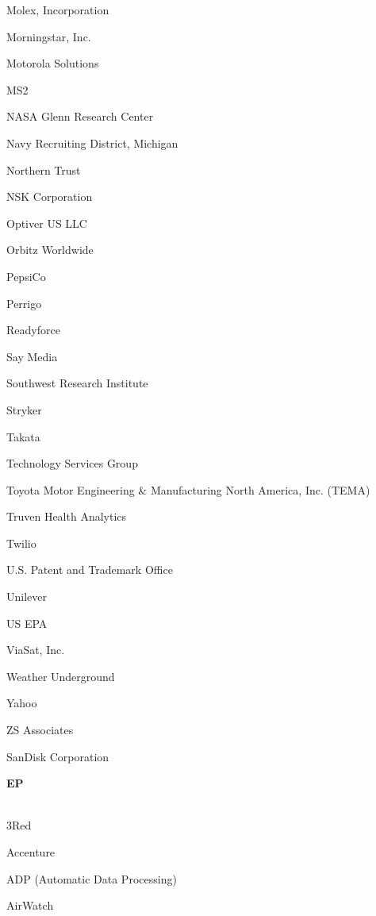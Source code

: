 \documentclass[twoside]{article}
\begin{document}
\begin{center}
\begin{multicols}{5}
\begin{FlushLeft}
\begin{compactitem}
\item Molex, Incorporation
\item Morningstar, Inc.
\item Motorola Solutions
\item MS2
\item NASA Glenn Research Center
\item Navy Recruiting District, Michigan
\item Northern Trust
\item NSK Corporation
\item Optiver US LLC
\item Orbitz Worldwide
\item PepsiCo
\item Perrigo
\item Readyforce
\item Say Media
\item Southwest Research Institute
\item Stryker
\item Takata
\item Technology Services Group
\item Toyota Motor Engineering \& Manufacturing North America, Inc. (TEMA)
\item Truven Health Analytics
\item Twilio
\item U.S. Patent and Trademark Office
\item Unilever
\item US EPA
\item ViaSat, Inc.
\item Weather Underground
\item Yahoo
\item ZS Associates
\item SanDisk Corporation
\end{compactitem}
        \end{FlushLeft}
        \vspace{1em}
        {\fontsize{14}{16}\selectfont \bf EP}\\
        \vspace{-1em}
        ~\hrulefill~
        \vspace{-.9em}
        \begin{FlushLeft}
        \begin{compactitem}
        \item 3Red
\item Accenture
\item ADP (Automatic Data Processing)
\item AirWatch

\end{compactitem}
\end{FlushLeft}
\end{multicols}
\end{center}
\end{document}
